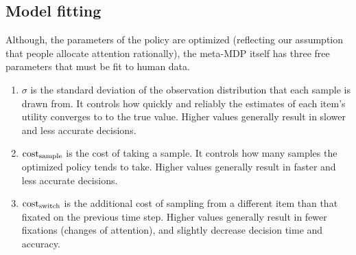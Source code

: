 \documentclass[12pt,a4paperpaper,]{article}
\begin{document}




\subsection{Model fitting}
Although, the parameters of the policy are optimized (reflecting our assumption that people allocate attention rationally), the meta-MDP itself has three free parameters that must be fit to human data.

\begin{enumerate}
  \item $\sigma$ is the standard deviation of the observation distribution that each sample is drawn from. It controls how quickly and reliably the estimates of each item's utility converges to to the true value. Higher values generally result in slower and less accurate decisions.
  \item $\text{cost}_\text{sample}$ is the cost of taking a sample. It controls how many samples the optimized policy tends to take. Higher values generally result in faster and less accurate decisions.
  \item $\text{cost}_\text{switch}$ is the additional cost of sampling from a different item than that fixated on the previous time step. Higher values generally result in fewer fixations (changes of attention), and slightly decrease decision time and accuracy.
\end{enumerate}
\end{document}
